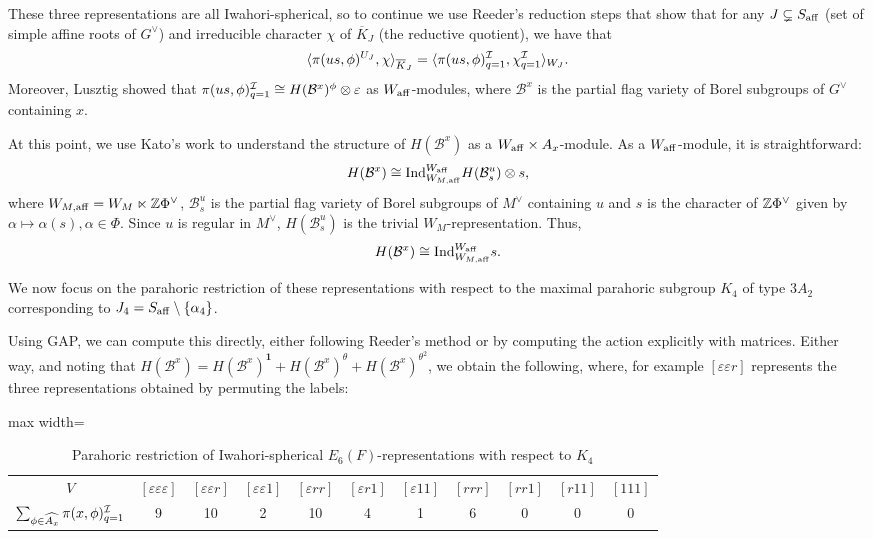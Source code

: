 These three representations are all Iwahori-spherical, so to continue we use Reeder's reduction steps that show that for any $J\subsetneq S_{\mathrm{aff}}$ (set of simple affine roots of $G^\vee$) and irreducible character $\chi$ of $\overline{K}_J$ (the reductive quotient), we have that
$$\langle\pi(us,\phi)^{U_J},\chi\rangle_{\overline{K}_J}=\langle\pi(us,\phi)^{\mathcal{I}}_{q=1},\chi^{\mathcal{I}}_{q=1}\rangle_{W_J}.$$
Moreover, Lusztig showed that $\pi(us,\phi)^{\mathcal{I}}_{q=1}\cong H(\mathcal{B}^x)^\phi\otimes\varepsilon$ as $W_{\mathrm{aff}}$-modules, where $\mathcal{B}^x$ is the partial flag variety of Borel subgroups of $G^\vee$ containing $x$. 

At this point, we use Kato's work to understand the structure of $H(\mathcal{B}^x)$ as a $W_{\mathrm{aff}}\times A_x$-module. As a $W_{\mathrm{aff}}$-module, it is straightforward: 
$$H(\mathcal{B}^x)\cong\mathrm{Ind}_{W_{M,\mathrm{aff}}}^{W_{\mathrm{aff}}}H(\mathcal{B}_s^u)\otimes s,$$
where $W_{M,\mathrm{aff}}=W_M\ltimes\mathbb{Z}\Phi^\vee$, $\mathcal{B}_s^u$ is the partial flag variety of Borel subgroups of $M^\vee$ containing $u$ and $s$ is the character of $\mathbb{Z}\Phi^\vee$ given by $\alpha\mapsto\alpha(s), \alpha\in\Phi$. Since $u$ is regular in $M^\vee$, $H(\mathcal{B}^u_s)$ is the trivial $W_M$-representation. Thus,
$$H(\mathcal{B}^x)\cong\mathrm{Ind}_{W_{M,\mathrm{aff}}}^{W_{\mathrm{aff}}}s.$$

We now focus on the parahoric restriction of these representations with respect to the maximal parahoric subgroup $K_4$ of type $3A_2$ corresponding to $J_4=S_{\mathrm{aff}}\setminus\{\alpha_4\}$.

Using GAP, we can compute this directly, either following Reeder's method or by computing the action explicitly with matrices. Either way, and noting that $H(\mathcal{B}^x)=H(\mathcal{B}^x)^{\mathbf{1}}+H(\mathcal{B}^x)^\theta+H(\mathcal{B}^x)^{\theta^2}$, we obtain the following, where, for example $[\varepsilon\varepsilon r]$ represents the three representations obtained by permuting the labels:

\begin{table}[ht]
    \centering
    
    \label{tab:worked_example_1}
    \begin{adjustbox}{max width=\linewidth}
    \begin{tabular}{|c|cccccccccc|}
    \hline
    $V$ & $[\varepsilon\varepsilon\varepsilon]$ & $[\varepsilon\varepsilon r]$ & $[\varepsilon\varepsilon 1]$ & $[\varepsilon r r]$ & $[\varepsilon r 1]$ & $[\varepsilon 1 1]$ & $[r r r]$ & $[r r 1]$ & $[r 1 1]$ & $[1 1 1]$ \\
    
    $\sum_{\phi\in\widehat{A_x}}\pi(x,\phi)^{\mathcal{I}}_{q=1}$         & 9 & 10 & 2 & 10 & 4 & 1 & 6 & 0 & 0 & 0 \\ \hline

    \end{tabular}
    \end{adjustbox}
    \caption{Parahoric restriction of Iwahori-spherical $E_6(F)$-representations with respect to $K_4$}
\end{table}


